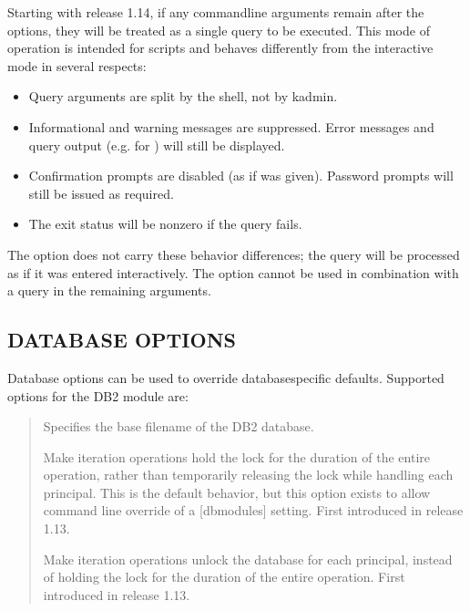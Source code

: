 \documentclass[letterpaper,10pt,english]{sphinxmanual}
\begin{document}
\sphinxAtStartPar
Starting with release 1.14, if any command\sphinxhyphen{}line arguments remain after
the options, they will be treated as a single query to be executed.
This mode of operation is intended for scripts and behaves differently
from the interactive mode in several respects:
\begin{itemize}
\item {} 
\sphinxAtStartPar
Query arguments are split by the shell, not by kadmin.

\item {} 
\sphinxAtStartPar
Informational and warning messages are suppressed.  Error messages
and query output (e.g. for ) will still be
displayed.

\item {} 
\sphinxAtStartPar
Confirmation prompts are disabled (as if  was given).
Password prompts will still be issued as required.

\item {} 
\sphinxAtStartPar
The exit status will be non\sphinxhyphen{}zero if the query fails.

\end{itemize}

\sphinxAtStartPar
The  option does not carry these behavior differences; the query
will be processed as if it was entered interactively.  The 
option cannot be used in combination with a query in the remaining
arguments.


\subsection{DATABASE OPTIONS}
\label{\detokenize{admin/admin_commands/kadmin_local:database-options}}\label{\detokenize{admin/admin_commands/kadmin_local:dboptions}}
\sphinxAtStartPar
Database options can be used to override database\sphinxhyphen{}specific defaults.
Supported options for the DB2 module are:
\begin{quote}
\begin{description}
\sphinxAtStartPar
Specifies the base filename of the DB2 database.

\sphinxAtStartPar
Make iteration operations hold the lock for the duration of
the entire operation, rather than temporarily releasing the
lock while handling each principal.  This is the default
behavior, but this option exists to allow command line
override of a {[}dbmodules{]} setting.  First introduced in
release 1.13.

\sphinxAtStartPar
Make iteration operations unlock the database for each
principal, instead of holding the lock for the duration of the
entire operation.  First introduced in release 1.13.

\end{description}
\end{quote}
\end{document}
